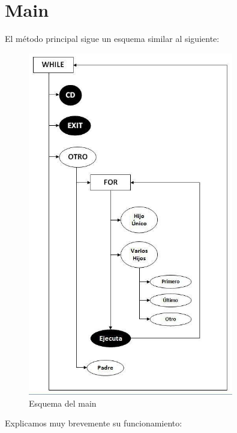 \section{Main}
El método principal sigue un esquema similar al siguiente:
\begin{figure}[]
\begin{center}
 \centering
 \includegraphics[width=0.8\textwidth]{./esquema}
 \caption{Esquema del main}
 \label{fig:Esquema del main}
\end{center}
\end{figure}
Explicamos muy brevemente su funcionamiento: 
